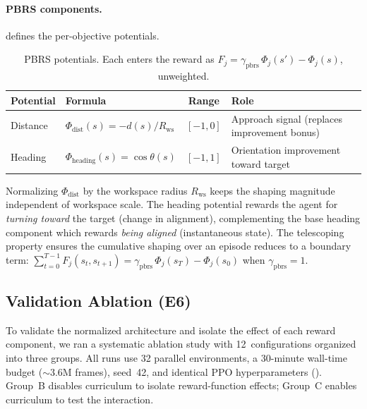 \documentclass[11pt]{article}
\begin{document}
\paragraph{PBRS components.}
 defines the per-objective potentials.

\begin{table}[H]
  \centering
  \small
  \renewcommand{\arraystretch}{1.3}
  \caption{PBRS potentials. Each enters the reward as $F_j = \gamma_{\text{pbrs}}\,\Phi_j(s') - \Phi_j(s)$, unweighted.}
  \label{tab:reward-pbrs}
  \begin{tabular}{@{}llcl@{}}
    \toprule
    \textbf{Potential} & \textbf{Formula} & \textbf{Range} & \textbf{Role} \\
    \midrule
    Distance & $\Phi_{\text{dist}}(s) = -d(s) / R_{\text{ws}}$  & $[-1, 0]$ & Approach signal (replaces improvement bonus) \\
    Heading  & $\Phi_{\text{heading}}(s) = \cos\theta(s)$        & $[-1, 1]$ & Orientation improvement toward target \\
    \bottomrule
  \end{tabular}
\end{table}

\noindent
Normalizing $\Phi_{\text{dist}}$ by the workspace radius $R_{\text{ws}}$ keeps the shaping magnitude independent of workspace scale.
The heading potential rewards the agent for \emph{turning toward} the target (change in alignment), complementing the base heading component which rewards \emph{being aligned} (instantaneous state).
The telescoping property ensures the cumulative shaping over an episode reduces to a boundary term: $\sum_{t=0}^{T-1} F_j(s_t, s_{t+1}) = \gamma_{\text{pbrs}}\,\Phi_j(s_T) - \Phi_j(s_0)$ when $\gamma_{\text{pbrs}} = 1$.

\subsection{Validation Ablation (E6)}
\label{sec:rl-dismech:ablation-v2}

To validate the normalized architecture and isolate the effect of each reward component, we ran a systematic ablation study with 12~configurations organized into three groups.
All runs use 32 parallel environments, a 30-minute wall-time budget (${\sim}$3.6M frames), seed~42, and identical PPO hyperparameters ().
Group~B disables curriculum to isolate reward-function effects; Group~C enables curriculum to test the interaction.
\end{document}

